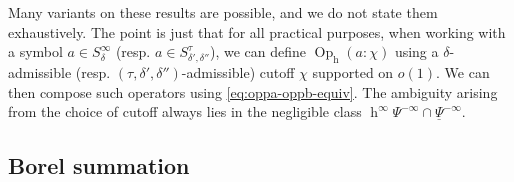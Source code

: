 \documentclass[reqno]{amsart}
\DeclareMathOperator{\h}{h}
\DeclareMathOperator{\Opp}{Op}
\theoremstyle{plain} \newtheorem{theorem} {Theorem}
\theoremstyle{definition} \newtheorem{definition} [theorem] {Definition}
\theoremstyle{itplain} %
\numberwithin{equation}{section}
\numberwithin{theorem}{section}
\begin{document}
Many variants on these results are possible, and we do not state them exhaustively.  The point is just that for all practical purposes, when working with a symbol $a \in S^\infty_\delta$ (resp. $a \in S^\tau_{\delta ', \delta ''}$), we can define $\Opp_{\h}(a:\chi)$ using a $\delta$-admissible (resp. $(\tau, \delta ', \delta '')$-admissible) cutoff $\chi$ supported on $o(1)$.  We can then compose such operators using \eqref{eq:oppa-oppb-equiv}.  The ambiguity arising from the choice of cutoff always lies in the negligible class $\h^\infty \Psi^{-\infty} \cap \underline{\Psi }^{-\infty}$.

\subsection{Borel summation}
\end{document}
